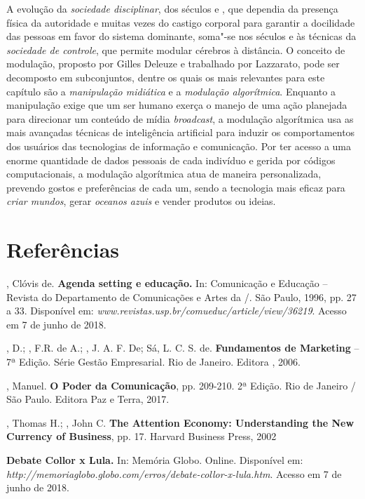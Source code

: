 A evolução da \emph{sociedade disciplinar}, dos séculos  e , que
dependia da presença física da autoridade e muitas vezes do castigo
corporal para garantir a docilidade das pessoas em favor do sistema
dominante, soma"-se nos séculos  e  às técnicas da \emph{sociedade
de controle}, que permite modular cérebros à distância. O conceito de
modulação, proposto por Gilles Deleuze e trabalhado por Lazzarato, pode
ser decomposto em subconjuntos, dentre os quais os mais relevantes para
este capítulo são a \emph{manipulação midiática} e a \emph{modulação
algorítmica}. Enquanto a manipulação exige que um ser humano exerça o
manejo de uma ação planejada para direcionar um conteúdo de mídia
\emph{broadcast}, a modulação algorítmica usa as mais avançadas técnicas
de inteligência artificial para induzir os comportamentos dos usuários
das tecnologias de informação e comunicação. Por ter acesso a uma enorme
quantidade de dados pessoais de cada indivíduo e gerida por códigos
computacionais, a modulação algorítmica atua de maneira personalizada,
prevendo gostos e preferências de cada um, sendo a tecnologia mais
eficaz para \emph{criar mundos}, gerar \emph{oceanos azuis} e vender
produtos ou ideias.

\section{Referências}

, Clóvis de. \textbf{Agenda setting e educação.} In:
Comunicação e Educação -- Revista do Departamento de Comunicações e
Artes da /. São Paulo, 1996, pp. 27 a 33. Disponível em:
\emph{www.revistas.usp.br/comueduc/article/view/36219}. Acesso em 7 de junho de 2018.

, D.; , F.R. de A.; , J. A. F. De; Sá, L. C. S. de.
\textbf{Fundamentos de Marketing} -- 7ª Edição. Série Gestão
Empresarial. Rio de Janeiro. Editora , 2006.

, Manuel. \textbf{O Poder da Comunicação}, pp. 209-210. 2ª
Edição. Rio de Janeiro / São Paulo. Editora Paz e Terra, 2017.

, Thomas H.; , John C. \textbf{The Attention Economy:
Understanding the New Currency of Business}, pp. 17. Harvard Business
Press, 2002

\textbf{Debate Collor x Lula.} In: Memória Globo. Online. Disponível em:
\emph{http://memoriaglobo.globo.com/erros/debate-collor-x-lula.htm}.
Acesso em 7 de junho de 2018.

